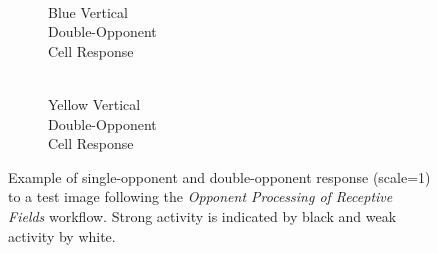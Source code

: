 \documentclass[journal,onecolumn]{IEEEtran}
\begin{document}
\begin{figure}[H]
\begin{subfigure}{0.15\textwidth}
        \caption{\\ Blue Vertical\\ Double-Opponent\\ Cell Response}
    \end{subfigure}
    \begin{subfigure}{0.15\textwidth}
        \centering
        \captionsetup{justification=centering}
        \caption{\\ Yellow Vertical\\ Double-Opponent\\ Cell Response}
    \end{subfigure}%
    \caption{Example of single-opponent and double-opponent response (scale=1) to a test image following the \textit{Opponent Processing of Receptive Fields} workflow. Strong activity is indicated by black and weak activity by white.}
    \label{fig:transform-opp}
\end{figure}
\end{document}
